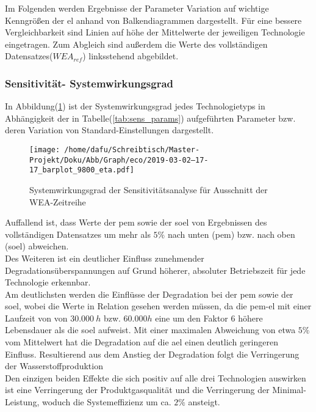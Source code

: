 \documentclass[onecolumn,10pt,titlepage]{article}
\begin{document}
Im Folgenden werden Ergebnisse der Parameter Variation auf wichtige Kenngrößen der \gls{el} anhand von Balkendiagrammen dargestellt. Für eine bessere Vergleichbarkeit sind Linien auf höhe der Mittelwerte der jeweiligen Technologie eingetragen.
Zum Abgleich sind außerdem die Werte des vollständigen Datensatzes($WEA_{ref}$) linksstehend abgebildet.

\newpage
\subsubsection{Sensitivität- Systemwirkungsgrad}
In Abbildung(\ref{fig:barplot_eco_9800_eta}) ist der Systemwirkungsgrad jedes Technologietyps in Abhängigkeit der in Tabelle(\ref{tab:sens_params}) aufgeführten Parameter bzw. deren Variation von Standard-Einstellungen dargestellt.\\


\begin{figure}[H]
	\centering
	\texttt{[image: /home/dafu/Schreibtisch/Master-Projekt/Doku/Abb/Graph/eco/2019-03-02--17-17\_barplot\_9800\_eta.pdf]}
	\caption[Systemwirkungsgrad Sensitivitätsanalyse]{Systemwirkungsgrad der Sensitivitätsanalyse für Ausschnitt der WEA-Zeitreihe}
	\label{fig:barplot_eco_9800_eta}
\end{figure}
Auffallend ist, dass Werte der \gls{pem} sowie der \gls{soel} von Ergebnissen des vollständigen Datensatzes um mehr als $5\%$ nach unten (\gls{pem}) bzw. nach oben (\gls{soel}) abweichen.\\ Des Weiteren ist ein deutlicher Einfluss zunehmender Degradationsüberspannungen auf Grund höherer, absoluter Betriebszeit für jede Technologie erkennbar.\\
Am deutlichsten werden die Einflüsse der Degradation bei der \gls{pem} sowie der \gls{soel}, wobei die Werte in Relation gesehen werden müssen, da die \gls{pem}-\gls{el} mit einer Laufzeit von von $30.000~h$ bzw. $60.000h$ eine um den Faktor 6 höhere Lebensdauer als die \gls{soel} aufweist. Mit einer maximalen Abweichung von etwa $5\%$ vom Mittelwert hat die Degradation auf die \gls{ael} einen deutlich geringeren Einfluss. Resultierend aus dem Anstieg der Degradation folgt die Verringerung der Wasserstoffproduktion\\
Den einzigen beiden Effekte die sich positiv auf alle drei Technologien auswirken ist eine Verringerung der Produktgasqualität und die Verringerung der Minimal-Leistung, woduch die Systemeffizienz um ca. $2\%$ ansteigt.
\end{document}
